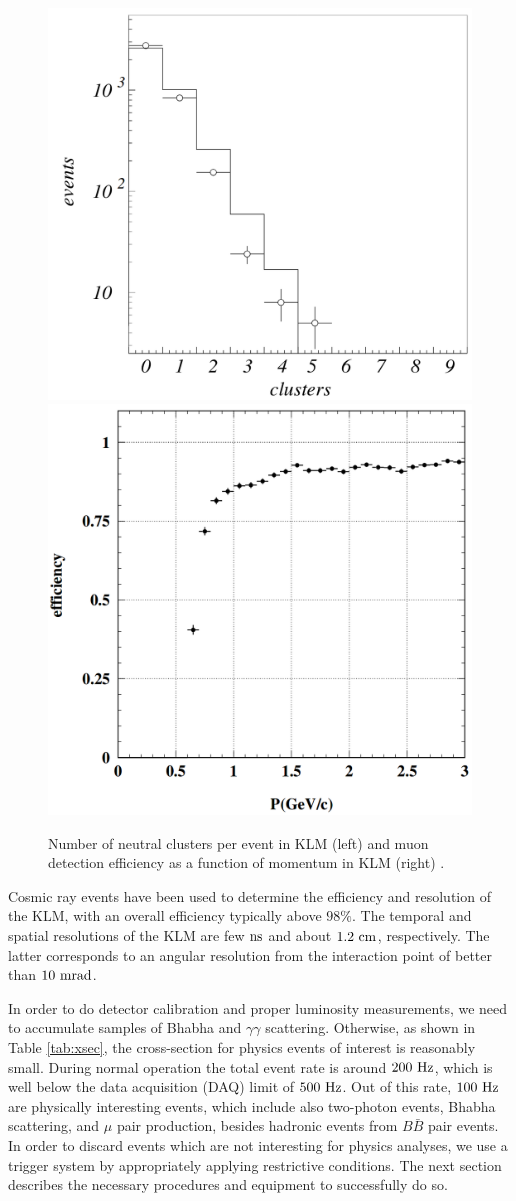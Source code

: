 \begin{figure}[H]
	\centering
	\captionsetup{width=0.8\linewidth}
	\includegraphics[width=0.48\linewidth,trim = 0cm -1.5cm 0cm 0cm]{fig/setup/KLM_clusters}
	\includegraphics[width=0.48\linewidth]{fig/setup/KLM_efficiency}
	\caption{Number of neutral clusters per event in KLM (left) and muon detection efficiency as a function of momentum in KLM (right) \cite{ABASHIAN2002117}.}
	\label{fig:KLM_eff}
\end{figure}

Cosmic ray events have been used to determine the efficiency and resolution of the KLM, with an overall efficiency typically above $98\%$. The temporal and spatial resolutions of the KLM are few$\mathrm{~ns}$ and about $1.2\mathrm{~cm}$, respectively. The latter corresponds to an angular resolution from the interaction point of better than $10\mathrm{~mrad}$.

In order to do detector calibration and proper luminosity measurements, we need to accumulate samples of Bhabha and $\gamma\gamma$ scattering. Otherwise, as shown in Table \ref{tab:xsec}, the cross-section for physics events of interest is reasonably small. During normal operation the total event rate is around $200\mathrm{~Hz}$, which is well below the data acquisition (DAQ) limit of $500\mathrm{~Hz}$. Out of this rate, $100\mathrm{~Hz}$ are physically interesting events, which include also two-photon events, Bhabha scattering, and $\mu$ pair production, besides hadronic events from $B \bar B$ pair events. In order to discard events which are not interesting for physics analyses, we use a trigger system by appropriately applying restrictive conditions. The next section describes the necessary procedures and equipment to successfully do so.


